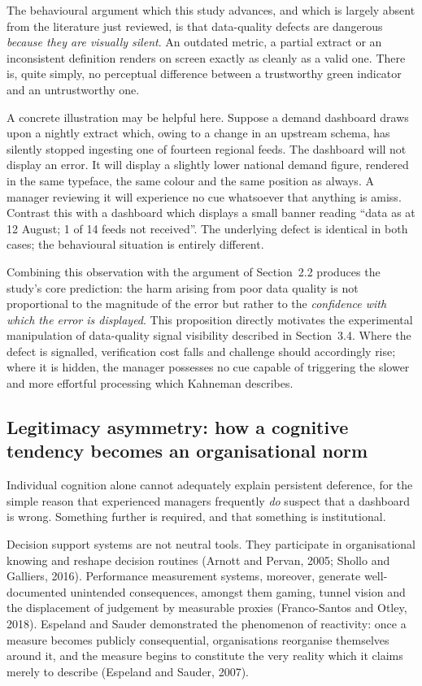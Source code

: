 \documentclass[11pt,a4paper]{article}
\numberwithin{figure}{section}
\numberwithin{table}{section}
\newcommand{\ct}[1]{\textcolor{citeblue}{#1}}          %
\newcommand{\xref}[1]{\textcolor{citeblue}{#1}}         %
\begin{document}
The behavioural argument which this study advances, and which is largely absent from the
literature just reviewed, is that data-quality defects are dangerous \emph{because they are
visually silent}. An outdated metric, a partial extract or an inconsistent definition renders on
screen exactly as cleanly as a valid one. There is, quite simply, no perceptual difference between
a trustworthy green indicator and an untrustworthy one.

A concrete illustration may be helpful here. Suppose a demand dashboard draws upon a nightly
extract which, owing to a change in an upstream schema, has silently stopped ingesting one of
fourteen regional feeds. The dashboard will not display an error. It will display a slightly lower
national demand figure, rendered in the same typeface, the same colour and the same position as
always. A manager reviewing it will experience no cue whatsoever that anything is amiss. Contrast
this with a dashboard which displays a small banner reading ``data as at 12 August; 1 of 14 feeds
not received''. The underlying defect is identical in both cases; the behavioural situation is
entirely different.

Combining this observation with the argument of \xref{Section~2.2} produces the study's core
prediction: the harm arising from poor data quality is not proportional to the magnitude of the
error but rather to the \emph{confidence with which the error is displayed}. This proposition
directly motivates the experimental manipulation of data-quality signal visibility described in
\xref{Section~3.4}. Where the defect is signalled, verification cost falls and challenge should
accordingly rise; where it is hidden, the manager possesses no cue capable of triggering the slower
and more effortful processing which Kahneman describes.

\subsection{Legitimacy asymmetry: how a cognitive tendency becomes an organisational norm}

Individual cognition alone cannot adequately explain persistent deference, for the simple reason
that experienced managers frequently \emph{do} suspect that a dashboard is wrong. Something further
is required, and that something is institutional.

Decision support systems are not neutral tools. They participate in organisational knowing and
reshape decision routines \ct{(Arnott and Pervan, 2005; Shollo and Galliers, 2016)}. Performance
measurement systems, moreover, generate well-documented unintended consequences, amongst them
gaming, tunnel vision and the displacement of judgement by measurable proxies \ct{(Franco-Santos
and Otley, 2018)}. Espeland and Sauder demonstrated the phenomenon of reactivity: once a measure
becomes publicly consequential, organisations reorganise themselves around it, and the measure
begins to constitute the very reality which it claims merely to describe \ct{(Espeland and Sauder,
2007)}.
\end{document}
